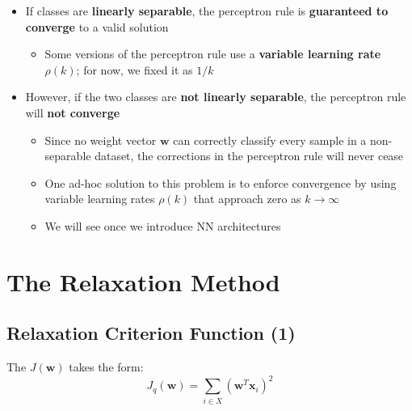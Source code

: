 \documentclass[11pt,a4paper]{article}
\theoremstyle{definition}
\theoremstyle{plain}
\theoremstyle{remark}
\begin{document}
\begin{tcolorbox}[colback=blue!5!white,colframe=blue!75!black,title=\textbf{Perceptron Convergence Properties}]
\begin{itemize}
    \item If classes are \textbf{linearly separable}, the perceptron rule is \textbf{guaranteed to converge} to a valid solution
    \begin{itemize}
        \item Some versions of the perceptron rule use a \textbf{variable learning rate} $\rho(k)$; for now, we fixed it as $1/k$
    \end{itemize}
    
    \item However, if the two classes are \textbf{not linearly separable}, the perceptron rule will \textbf{not converge}
    \begin{itemize}
        \item Since no weight vector $\mathbf{w}$ can correctly classify every sample in a non-separable dataset, the corrections in the perceptron rule will never cease
        
        \item One ad-hoc solution to this problem is to enforce convergence by using variable learning rates $\rho(k)$ that approach zero as $k \rightarrow \infty$
        
        \item We will see once we introduce NN architectures
    \end{itemize}
\end{itemize}
\end{tcolorbox}

\section{The Relaxation Method}

\subsection{Relaxation Criterion Function (1)}

The $J(\mathbf{w})$ takes the form:
\[
J_q(\mathbf{w}) = \sum_{i \in X} (\mathbf{w}^T \mathbf{x}_i)^2
\]
\end{document}
